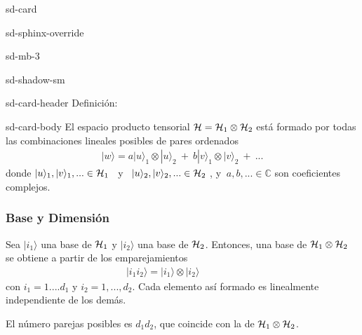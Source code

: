 \documentclass[letterpaper,10pt,english]{jupyterBook}
\newcommand{\ket}[1]{|#1\rangle}
\newcommand{\Hil}{{\cal H}}
\begin{document}
\begin{sphinxuseclass}{sd-card}
\begin{sphinxuseclass}{sd-sphinx-override}
\begin{sphinxuseclass}{sd-mb-3}
\begin{sphinxuseclass}{sd-shadow-sm}
\begin{sphinxuseclass}{sd-card-header}
\sphinxAtStartPar
Definición:

\end{sphinxuseclass}
\begin{sphinxuseclass}{sd-card-body}
\sphinxAtStartPar
El  espacio producto tensorial  \(\Hil = \Hil_1 \otimes \Hil_2\) está formado por  todas las combinaciones lineales posibles de   pares ordenados
\begin{equation*}
\begin{split}
\ket{w}= a\ket{u}_1\otimes\ket{u}_2 ~+~ b \ket{v}_1\otimes\ket{v}_2 ~+ ~...
\end{split}
\end{equation*}
\sphinxAtStartPar
donde  \(\ket{u}_1,\ket{v}_1,...\in \Hil_1\, ~\) y \(~\, \ket{u}_2,\ket{v}_2,...\in \Hil_2~\),
y \(~a,b,... \in {\mathbb C}\) son coeficientes complejos.

\end{sphinxuseclass}
\end{sphinxuseclass}
\end{sphinxuseclass}
\end{sphinxuseclass}
\end{sphinxuseclass}

\subsubsection{Base y Dimensión}
\label{\detokenize{docs/Part_01_Formalismo/Chapter_01_02_Formalismo_matem_xe1tico/01_04_Tensores_myst:base-y-dimension}}
\sphinxAtStartPar
Sea \(\ket{i_1}\) una base de \(\Hil_1\) y \(\ket{i_2}\) una base de \(\Hil_2\). Entonces, una base de \(\Hil_1\otimes \Hil_2\) se obtiene
a partir de  los emparejamientos
\begin{equation*}
\begin{split}
\ket{i_1 i_2} = \ket{i_1}\otimes \ket{i_2}~~~~~~~~~~~~~~~~~~ 
\end{split}
\end{equation*}
\sphinxAtStartPar
con
\(
i_1=1....d_1\) y \(i_2=1,...,d_2
\). Cada elemento así formado es linealmente independiente de los demás.

\sphinxAtStartPar
El número parejas posibles es \(d_1d_2\), que coincide con la  de \(\Hil_1\otimes \Hil_2\).
\end{document}
